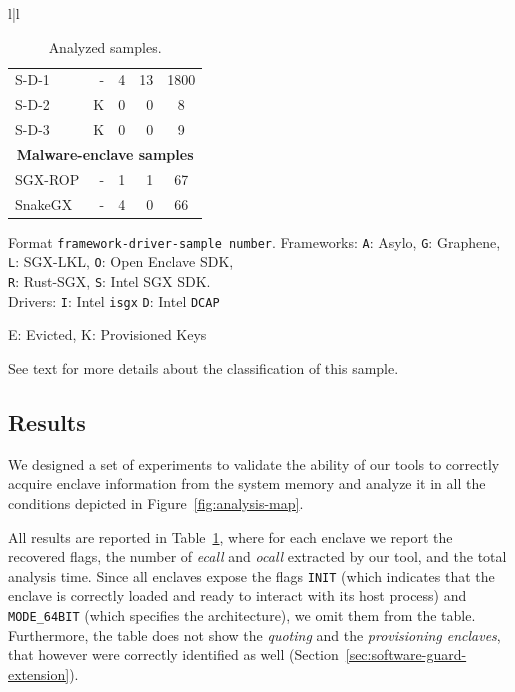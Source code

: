 \begin{table}
\begin{tabular}{l|l}
\begin{minipage}[t]{.45\textwidth}
\begin{threeparttable}[Ht!]
\begin{tabularx}{\columnwidth}{Xrrrc}
					S-D-1  & - & 4 & 13  & 1800 \\
					S-D-2  & K & 0 & 0   & 8 \\
					S-D-3  & K & 0 & 0   & 9 \\
					\midrule
					\multicolumn{5}{c}{\textbf{Malware-enclave samples}} \\
					\midrule
					SGX-ROP & - & 1 & 1  & 67 \\
					SnakeGX & - & 4 & 0  & 66 \\
					\bottomrule
				\end{tabularx}
				\begin{tablenotes}
					\scriptsize
					\item[1]Format \texttt{framework-driver-sample number}. 
					Frameworks:
					\texttt{A}: Asylo, \texttt{G}: Graphene, \\ \texttt{L}: 
					SGX-LKL,
					\texttt{O}: Open Enclave SDK, \\ \texttt{R}: Rust-SGX, 
					\texttt{S}: Intel
					SGX SDK.\\Drivers: \texttt{I}: Intel \texttt{isgx} 
					\texttt{D}: Intel
					\texttt{DCAP}
					\item[2]E: Evicted, K: Provisioned Keys
					\item[3]See text for more details about the classification 
					of this sample.
				\end{tablenotes}
				\vspace{3mm}
			\end{threeparttable}
		\end{minipage}
	\end{tabular}
	\caption{Analyzed samples.}
	\label{tbl:all_samples}
\end{table}

\subsection{Results}
\label{ssec:correctness}

We designed a set of experiments to validate the ability of our tools to 
correctly acquire 
enclave information from the system memory and 
analyze it in all the conditions depicted in 
Figure~\ref{fig:analysis-map}.

All results are reported in Table~\ref{tbl:all_samples}, where 
for each enclave we report the recovered flags, the number of \emph{ecall} and 
\emph{ocall} extracted by our tool, and the total analysis time.
Since all enclaves expose the flags \texttt{INIT} (which indicates that the 
enclave
is correctly loaded and ready to interact with its host process) and 
\texttt{MODE\_64BIT} (which specifies the architecture), we omit them from the 
table.
Furthermore, the table does not show the \emph{quoting} and the 
\emph{provisioning enclaves}, that however were correctly identified as well 
(Section~\ref{sec:software-guard-extension}).

